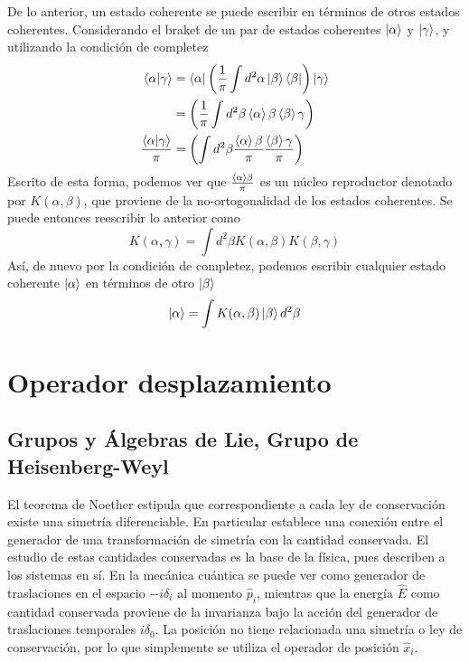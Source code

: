De lo anterior, un estado coherente se puede escribir en términos de otros estados coherentes. Considerando el braket de un par de estados coherentes $\ket{\alpha}$ y $\ket{\gamma}$, y utilizando la condición de completez
\begin{align*}
  \braket{\alpha|\gamma}             & =  \bra{{\alpha}}\left(\frac{1}{\pi}\int d^2 \alpha \ket{\beta}\bra{\beta} \right) \ket{\gamma}      \\
                                     & = \left(\frac{1}{\pi}\int d^2 \beta \braket{\alpha}{\beta}\braket{\beta}{\gamma} \right)             \\
  \frac{\braket{\alpha|\gamma}}{\pi} & = \left(\int d^2 \beta \frac{\braket{\alpha}{\beta}}{\pi} \frac{\braket{\beta}{\gamma}}{\pi} \right)
\end{align*}
Escrito de esta forma, podemos ver que $\frac{\braket{\alpha}{\beta}}{\pi}$ es un núcleo reproductor denotado por $K(\alpha, \beta)$, que proviene de la no-ortogonalidad de los estados coherentes. Se puede entonces reescribir lo anterior como
\begin{equation*}
  K(\alpha, \gamma) = \int d^2 \beta K(\alpha, \beta) K(\beta, \gamma)
\end{equation*}
Así, de nuevo por la condición de completez, podemos escribir cualquier estado coherente $\ket{\alpha}$ en términos de otro $\ket{\beta}$
\begin{equation*}
  \ket{\alpha} = \int K(\alpha, \beta) \ket{\beta} d^2\beta
\end{equation*}
\section{Operador desplazamiento}
\subsection{Grupos y Álgebras de Lie, Grupo de Heisenberg-Weyl}

El teorema de Noether estipula que correspondiente a cada ley de conservación existe una simetría diferenciable. En particular establece una conexión entre el generador de una transformación de simetría con la cantidad conservada. El estudio de estas cantidades conservadas es la base de la física, pues describen a los sistemas en sí. En la mecánica cuántica se puede ver como generador de traslaciones en el espacio $-i\delta_i$ al momento $\hat{p}_i$, mientras que la energía $\hat{E}$ como cantidad conservada proviene de la invarianza bajo la acción del generador de traslaciones temporales $i\delta_0$. La posición no tiene relacionada una simetría o ley de conservación, por lo que simplemente se utiliza el operador de posición $\hat{x}_i$. \cite{Schwichtenberg}

